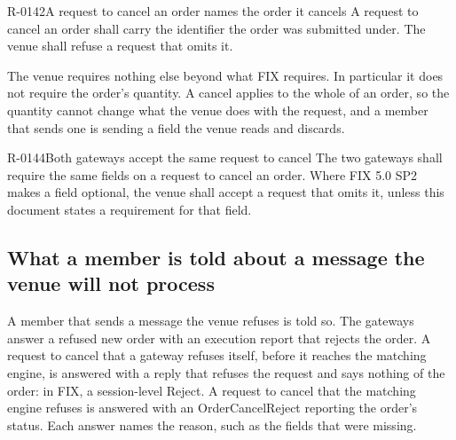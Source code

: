 \begin{requirement}{R-0142}{A request to cancel an order names the order it cancels}
  A request to cancel an order shall carry the identifier the order was submitted under.
  The venue shall refuse a request that omits it.
\end{requirement}

The venue requires nothing else beyond what FIX requires. In particular it does not
require the order's quantity. A cancel applies to the whole of an order, so the quantity
cannot change what the venue does with the request, and a member that sends one is sending
a field the venue reads and discards.

\begin{requirement}{R-0144}{Both gateways accept the same request to cancel}
  The two gateways shall require the same fields on a request to cancel an order. Where
  FIX 5.0 SP2 makes a field optional, the venue shall accept a request that omits it,
  unless this document states a requirement for that field.
\end{requirement}

\subsection{What a member is told about a message the venue will not process}
\label{subsec:refused_message_reply}

A member that sends a message the venue refuses is told so. The gateways answer a refused
new order with an execution report that rejects the order. A request to cancel that a gateway
refuses itself, before it reaches the matching engine, is answered with a reply that refuses
the request and says nothing of the order: in FIX, a session-level Reject. A request to cancel
that the matching engine refuses is answered with an OrderCancelReject reporting the order's
status. Each answer names the reason, such as the fields that were missing.

